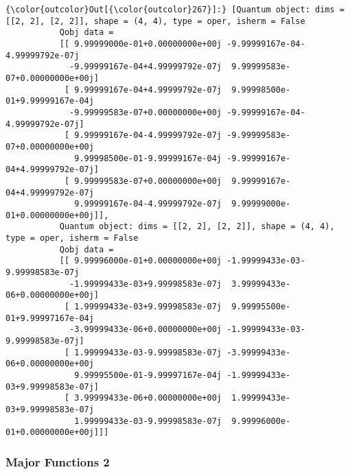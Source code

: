 \documentclass[11pt]{article}
\begin{document}
\begin{Verbatim}[commandchars=\\\{\}]
{\color{outcolor}Out[{\color{outcolor}267}]:} [Quantum object: dims = [[2, 2], [2, 2]], shape = (4, 4), type = oper, isherm = False
           Qobj data =
           [[ 9.99999000e-01+0.00000000e+00j -9.99999167e-04-4.99999792e-07j
             -9.99999167e-04+4.99999792e-07j  9.99999583e-07+0.00000000e+00j]
            [ 9.99999167e-04+4.99999792e-07j  9.99998500e-01+9.99999167e-04j
             -9.99999583e-07+0.00000000e+00j -9.99999167e-04-4.99999792e-07j]
            [ 9.99999167e-04-4.99999792e-07j -9.99999583e-07+0.00000000e+00j
              9.99998500e-01-9.99999167e-04j -9.99999167e-04+4.99999792e-07j]
            [ 9.99999583e-07+0.00000000e+00j  9.99999167e-04+4.99999792e-07j
              9.99999167e-04-4.99999792e-07j  9.99999000e-01+0.00000000e+00j]],
           Quantum object: dims = [[2, 2], [2, 2]], shape = (4, 4), type = oper, isherm = False
           Qobj data =
           [[ 9.99996000e-01+0.00000000e+00j -1.99999433e-03-9.99998583e-07j
             -1.99999433e-03+9.99998583e-07j  3.99999433e-06+0.00000000e+00j]
            [ 1.99999433e-03+9.99998583e-07j  9.99995500e-01+9.99997167e-04j
             -3.99999433e-06+0.00000000e+00j -1.99999433e-03-9.99998583e-07j]
            [ 1.99999433e-03-9.99998583e-07j -3.99999433e-06+0.00000000e+00j
              9.99995500e-01-9.99997167e-04j -1.99999433e-03+9.99998583e-07j]
            [ 3.99999433e-06+0.00000000e+00j  1.99999433e-03+9.99998583e-07j
              1.99999433e-03-9.99998583e-07j  9.99996000e-01+0.00000000e+00j]]]
\end{Verbatim}
            
    \hypertarget{major-functions-2}{%
\subsubsection{Major Functions 2}\label{major-functions-2}}
\end{document}
